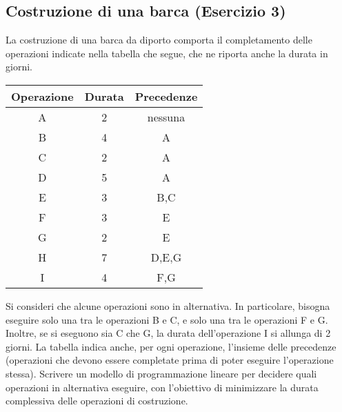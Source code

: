 

\subsection{Costruzione di una barca (Esercizio 3)}

La costruzione di una barca da diporto comporta il completamento delle operazioni indicate nella tabella che segue, che ne riporta anche la durata in giorni.

\begin{table}[htbp]
	\centering
	\begin{tabular}{ccc}
		\textbf{Operazione} & \textbf{Durata} & \textbf{Precedenze} \\ \hline
		A                   & 2               & nessuna             \\ 
		B                   & 4               & A                   \\ 
		C                   & 2               & A                   \\ 
		D                   & 5               & A                   \\ 
		E                   & 3               & B,C                 \\ 
		F                   & 3               & E                   \\ 
		G                   & 2               & E                   \\ 
		H                   & 7               & D,E,G               \\ 
		I                   & 4               & F,G                 \\ 
	\end{tabular}
\end{table}

Si consideri che alcune operazioni sono in alternativa. In particolare, bisogna eseguire solo una tra le operazioni B e C, e solo una tra le operazioni F e G. Inoltre, se si eseguono sia C che G, la durata dell'operazione I si allunga di 2 giorni.
La tabella indica anche, per ogni operazione, l'insieme delle precedenze (operazioni che devono essere completate prima di poter eseguire l'operazione stessa).
Scrivere un modello di programmazione lineare per decidere quali operazioni in alternativa eseguire, con l'obiettivo di minimizzare la durata complessiva delle operazioni di costruzione.

